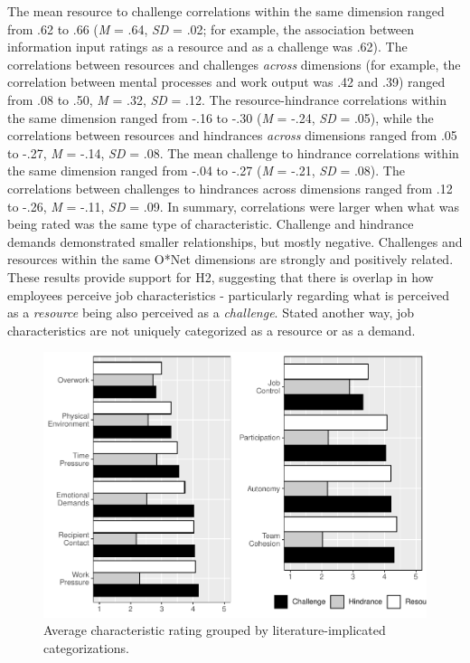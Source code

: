 \documentclass[
  jou,mask]{apa6}
\begin{document}
The mean resource to challenge correlations within the same dimension ranged from .62 to .66 (\emph{M} = .64, \emph{SD} = .02; for example, the association between information input ratings as a resource and as a challenge was .62). The correlations between resources and challenges \emph{across} dimensions (for example, the correlation between mental processes and work output was .42 and .39) ranged from .08 to .50, \emph{M} = .32, \emph{SD} = .12. The resource-hindrance correlations within the same dimension ranged from -.16 to -.30 (\emph{M} = -.24, \emph{SD} = .05), while the correlations between resources and hindrances \emph{across} dimensions ranged from .05 to -.27, \emph{M} = -.14, \emph{SD} = .08. The mean challenge to hindrance correlations within the same dimension ranged from -.04 to -.27 (\emph{M} = -.21, \emph{SD} = .08). The correlations between challenges to hindrances across dimensions ranged from .12 to -.26, \emph{M} = -.11, \emph{SD} = .09. In summary, correlations were larger when what was being rated was the same type of characteristic. Challenge and hindrance demands demonstrated smaller relationships, but mostly negative. Challenges and resources within the same O*Net dimensions are strongly and positively related. These results provide support for H2, suggesting that there is overlap in how employees perceive job characteristics - particularly regarding what is perceived as a \emph{resource} being also perceived as a \emph{challenge}. Stated another way, job characteristics are not uniquely categorized as a resource or as a demand.

\begin{figure}
\centering
\includegraphics{Submission_files/figure-latex/scalelevelgraphs-1.pdf}
\caption{\label{fig:scalelevelgraphs}Average characteristic rating grouped by literature-implicated categorizations.}
\end{figure}
\end{document}
